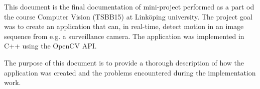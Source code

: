 This document is the final documentation of mini-project performed as a part od the course Computer Vision (TSBB15) at Linköping university. 
The project goal was to create an application that can, in real-time, detect motion in an image sequence from e.g. a surveillance camera. 
The application was implemented in C++ using the OpenCV API.

The purpose of this document is to provide a thorough description of how the application was created and the problems encountered during the implementation work.
